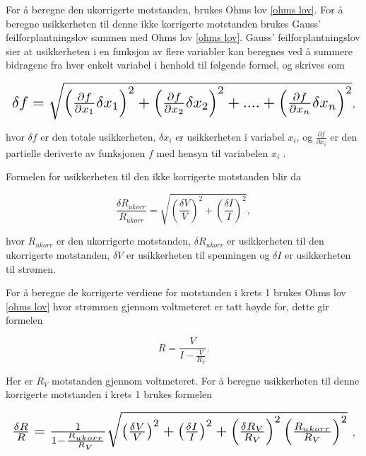 \documentclass[twocolumn, a4paper, 11pt]{article} %
\begin{document}
For å beregne den ukorrigerte motstanden, brukes Ohms lov \eqref{ohms lov}. For å beregne usikkerheten til denne ikke korrigerte motstanden brukes Gauss’ feilforplantningslov sammen med Ohms lov \eqref{ohms lov}. Gauss’ feilforplantningslov sier at usikkerheten i en funksjon av flere variabler kan beregnes ved å summere bidragene fra hver enkelt variabel i henhold til følgende formel, og skrives som 

\begin{equation}
\resizebox{1.0\hsize}{!}{$
\delta f = \sqrt{{\left(\frac{\partial f}{\partial x_1} \delta x_1\right)}^2 + {\left(\frac{\partial f}{\partial x_2} \delta x_2 \right)}^2 + .... +{\left(\frac{\partial f}{\partial x_n} {\delta x_n} \right)}^2}
$},
\label{usikkerhet_f}
\end{equation}

hvor $\delta f$ er den totale usikkerheten, $\delta x_i$ er usikkerheten i variabel $x_i$, og $\frac{\partial f}{\partial x_i}$ er den partielle deriverte av funksjonen $f$ med hensyn til variabelen $x_i$ \cite{taylor1997error}.

Formelen for usikkerheten til den ikke korrigerte motstanden blir da

\begin{equation}
    \frac{\delta R_{ukorr}}{R_{ukorr}} = \sqrt{\left(\frac{\delta V}{V}\right)^2 + \left(\frac{\delta I}{I}\right)^2},
    \label{formel_krets1og2_delta_R_ukorr}
\end{equation}

hvor $R_{ukorr}$ er den ukorrigerte motstanden, $\delta R_{ukorr}$ er usikkerheten til den ukorrigerte motstanden, $\delta V$ er usikkerheten til spenningen og $\delta I$ er usikkerheten til strømen.


\bigskip

For  å beregne de korrigerte verdiene for motstanden i krets 1 brukes Ohms lov \eqref{ohms lov} hvor strømmen gjennom voltmeteret er tatt høyde for, dette gir formelen

\begin{equation}
    R = \frac{V}{I - \frac{V}{R_V}}.
    \label{formel_krets1_R_korr}
\end{equation}

Her er $R_V$ motstanden gjennom voltmeteret. For å beregne usikkerheten til denne korrigerte motstanden i krets 1 brukes formelen

\begin{equation}
\resizebox{1.0\hsize}{!}{$
    \frac{\delta R}{R} = \frac{1}{1- \frac{R_{ukorr}}{R_V}}
    \sqrt{\left(\frac{\delta V}{V}\right)^2 + \left(\frac{\delta I}{I}\right)^2 + \left(\frac{\delta R_V}{R_V}\right)^2 \left(\frac{R_{ukorr}}{R_V}\right)^2}$
    },
    \label{formel_krets1_delta_R_korr}
\end{equation}
\end{document}
